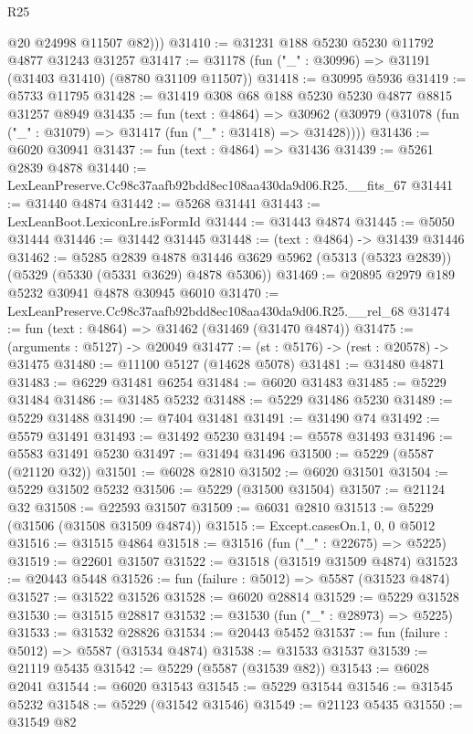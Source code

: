 \begin{lexlean}{R25}
\begin{coremodule}
          @20
          @24998
          @11507
          @82)))
@31410 := @31231 @188 @5230 @5230 @11792 @4877 @31243 @31257
@31417 := @31178 (fun ("_" : @30996) => @31191 (@31403 @31410) (@8780 @31109 @11507))
@31418 := @30995 @5936
@31419 := @5733 @11795
@31428 := @31419 @308 @68 @188 @5230 @5230 @4877 @8815 @31257 @8949
@31435 := fun (text : @4864) =>
  @30962 (@30979 (@31078 (fun ("_" : @31079) => @31417 (fun ("_" : @31418) => @31428))))
@31436 := @6020 @30941
@31437 := fun (text : @4864) => @31436
@31439 := @5261 @2839 @4878
@31440 := LexLeanPreserve.Cc98c37aafb92bdd8ec108aa430da9d06.R25.__fits_67
@31441 := @31440 @4874
@31442 := @5268 @31441
@31443 := LexLeanBoot.LexiconLre.isFormId
@31444 := @31443 @4874
@31445 := @5050 @31444
@31446 := @31442 @31445
@31448 := (text : @4864) -> @31439 @31446
@31462 := @5285
    @2839
    @4878
    @31446
    @3629
    @5962
    (@5313 (@5323 @2839))
    (@5329 (@5330 (@5331 @3629) @4878 @5306))
@31469 := @20895 @2979 @189 @5232 @30941 @4878 @30945 @6010
@31470 := LexLeanPreserve.Cc98c37aafb92bdd8ec108aa430da9d06.R25.__rel_68
@31474 := fun (text : @4864) => @31462 (@31469 (@31470 @4874))
@31475 := (arguments : @5127) -> @20049
@31477 := (st : @5176) -> (rest : @20578) -> @31475
@31480 := @11100 @5127 (@14628 @5078)
@31481 := @31480 @4871
@31483 := @6229 @31481 @6254
@31484 := @6020 @31483
@31485 := @5229 @31484
@31486 := @31485 @5232
@31488 := @5229 @31486 @5230
@31489 := @5229 @31488
@31490 := @7404 @31481
@31491 := @31490 @74
@31492 := @5579 @31491
@31493 := @31492 @5230
@31494 := @5578 @31493
@31496 := @5583 @31491 @5230
@31497 := @31494 @31496
@31500 := @5229 (@5587 (@21120 @32))
@31501 := @6028 @2810
@31502 := @6020 @31501
@31504 := @5229 @31502 @5232
@31506 := @5229 (@31500 @31504)
@31507 := @21124 @32
@31508 := @22593 @31507
@31509 := @6031 @2810
@31513 := @5229 (@31506 (@31508 @31509 @4874))
@31515 := Except.casesOn.{1, 0, 0} @5012
@31516 := @31515 @4864
@31518 := @31516 (fun ("_" : @22675) => @5225)
@31519 := @22601 @31507
@31522 := @31518 (@31519 @31509 @4874)
@31523 := @20443 @5448
@31526 := fun (failure : @5012) => @5587 (@31523 @4874)
@31527 := @31522 @31526
@31528 := @6020 @28814
@31529 := @5229 @31528
@31530 := @31515 @28817
@31532 := @31530 (fun ("_" : @28973) => @5225)
@31533 := @31532 @28826
@31534 := @20443 @5452
@31537 := fun (failure : @5012) => @5587 (@31534 @4874)
@31538 := @31533 @31537
@31539 := @21119 @5435
@31542 := @5229 (@5587 (@31539 @82))
@31543 := @6028 @2041
@31544 := @6020 @31543
@31545 := @5229 @31544
@31546 := @31545 @5232
@31548 := @5229 (@31542 @31546)
@31549 := @21123 @5435
@31550 := @31549 @82

\end{coremodule}
\end{lexlean}
